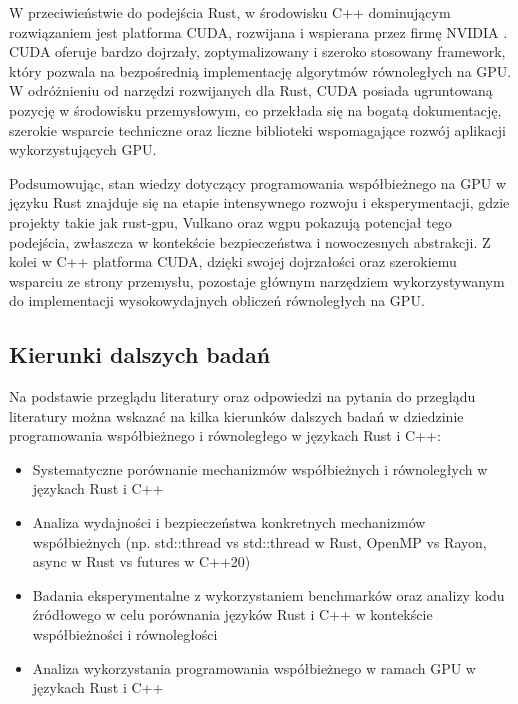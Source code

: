 W przeciwieństwie do podejścia Rust, w środowisku C++ dominującym rozwiązaniem jest platforma CUDA, rozwijana i wspierana przez firmę NVIDIA \cite{nvidiaCUDAToolkit}. CUDA oferuje bardzo dojrzały, zoptymalizowany i szeroko stosowany framework, który pozwala na bezpośrednią implementację algorytmów równoległych na GPU. W odróżnieniu od narzędzi rozwijanych dla Rust, CUDA posiada ugruntowaną pozycję w środowisku przemysłowym, co przekłada się na bogatą dokumentację, szerokie wsparcie techniczne oraz liczne biblioteki wspomagające rozwój aplikacji wykorzystujących GPU.

Podsumowując, stan wiedzy dotyczący programowania współbieżnego na GPU w języku Rust znajduje się na etapie intensywnego rozwoju i eksperymentacji, gdzie projekty takie jak rust‑gpu, Vulkano oraz wgpu \cite{wgpuWgpuPortable} pokazują potencjał tego podejścia, zwłaszcza w kontekście bezpieczeństwa i nowoczesnych abstrakcji. Z kolei w C++ platforma CUDA, dzięki swojej dojrzałości oraz szerokiemu wsparciu ze strony przemysłu, pozostaje głównym narzędziem wykorzystywanym do implementacji wysokowydajnych obliczeń równoległych na GPU.

\subsection{Kierunki dalszych badań}
Na podstawie przeglądu literatury oraz odpowiedzi na pytania do przeglądu literatury można wskazać na kilka kierunków dalszych badań w dziedzinie programowania współbieżnego i równoległego w językach Rust i C++:
\begin{itemize}
    \item Systematyczne porównanie mechanizmów współbieżnych i równoległych w językach Rust i C++
    \item Analiza wydajności i bezpieczeństwa konkretnych mechanizmów współbieżnych (np. std::thread vs std::thread w Rust, OpenMP vs Rayon, async w Rust vs futures w C++20)
    \item Badania eksperymentalne z wykorzystaniem benchmarków oraz analizy kodu źródłowego w celu porównania języków Rust i C++ w kontekście współbieżności i równoległości
    \item Analiza wykorzystania programowania współbieżnego w ramach GPU w językach Rust i C++
\end{itemize}
